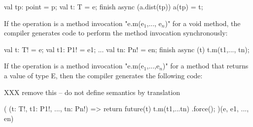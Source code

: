 \begin{xten}
val tp: point = p;
val t: T = e;
finish async (a.dist(tp)) { a(tp) = t; }
\end{xten}

If the operation is a method invocation \xcdmath"e.m(e$_1$,..., e$_n$)"
for a void method, the compiler generates code to
perform the method invocation synchronously:

\begin{xten}
val t: T! = e;
val t1: P1! = e1;
...
val tn: Pn! = en;
finish async (t) {
  t.m(t1,..., tn);
}
\end{xten}


If the operation is a method invocation
\xcdmath"e.m(e$_1$,...,e$_n$)" for a method that returns a value
of type E, then the compiler generates the following code:

XXX remove this -- do not define semantics by translation

\begin{xten}
( (t: T!, t1: P1!, ..., tn: Pn!) => { 
    return future(t) { t.m(t1,...tn) }.force();
  } )(e, e1, ..., en)
\end{xten}


